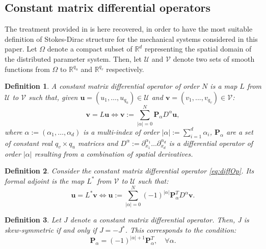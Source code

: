 \documentclass[11t]{article}
\newtheorem{definition}{Definition}
\begin{document}
{		\subsection{Constant matrix differential operators}
		The treatment provided in \cite{MacchelliModelling} is here recovered, in order to have the most suitable definition of Stokes-Dirac structure for the mechanical systems considered in this paper.
		Let $\Omega$ denote a compact subset of $\mathbb{R}^d$ representing the spatial domain of the distributed parameter system. Then, let $\mathcal{U}$ and $\mathcal{V}$ denote two sets of smooth functions from $\Omega$ to $\mathbb{R}^{q_u}$ and $\mathbb{R}^{q_v}$ respectively.
		\begin{definition}
			A constant matrix differential operator of order $N$ is a map $L$ from $\mathcal{U}$ to $\mathcal{V}$ such that, given $\bm{u} = (u_1 , \dots , u_{q_u}) \in \mathcal{U}$ and $\bm{v} = (v_1 , . . . , v_{q_v}) \in \mathcal{V}$:
			\begin{equation}
			\label{eq:diffOp}
			\bm{v} = L \bm{u} \iff \bm{v} := \sum_{|\alpha|=0}^N  \bm{P}_{\alpha} D^{\alpha} \bm{u},
			\end{equation}
			where $\alpha := (\alpha_1, \dots , \alpha_d)$ is a multi-index of order $|\alpha| := \sum_{i=1}^d \alpha_i$, $\bm{P}_\alpha$ are a set of constant real $q_v \times q_u$ matrices and $D^{\alpha} := \partial_{x_1}^{\alpha_1} \dots \partial_{x_d}^{\alpha_d}$ is a differential operator of order $|\alpha|$ resulting from a combination of spatial derivatives. 
		\end{definition}
		\begin{definition}
			Consider the constant matrix differential operator \eqref{eq:diffOp}. Its formal adjoint is the map $L^*$ from $\mathcal{V}$ to $\mathcal{U}$ such that:
			\begin{equation}
			\bm{u} = L^* \bm{v} \iff \bm{u} := \sum_{|\alpha|=0}^N  (-1)^{|\alpha|} \bm{P}_{\alpha}^T D^{\alpha} \bm{v}.
			\end{equation}
		\end{definition}
		\begin{definition}
			\label{def:skewOp}
			Let $J$ denote a constant matrix differential operator. Then, J is skew-symmetric if and only if $J = -J^*$. This corresponds to the condition:
			\begin{equation}
			\bm{P}_{\alpha} = (-1)^{|\alpha| + 1} \bm{P}_{\alpha}^T, \quad \forall \alpha.
			\end{equation}
		\end{definition}
}
\end{document}
